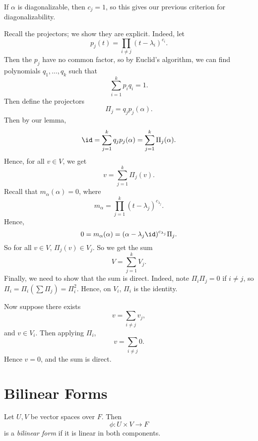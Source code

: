 \documentclass[12pt]{article}
\begin{document}
\begin{remark}
	If $\alpha$ is diagonalizable, then $c_j = 1$, so this gives our previous criterion for diagonalizability.
\end{remark}

\begin{proofbox}
	Recall the projectors; we show they are explicit. Indeed, let
	\[
		p_j(t) = \prod_{i \neq j}(t - \lambda_i)^{c_i}
	.\]
	Then the $p_j$ have no common factor, so by Euclid's algorithm, we can find polynomials $q_1, \ldots, q_k$ such that
	\[
	\sum_{i = 1}^{k} p_i q_i = 1
	.\]
	Then define the projectors
	\[
		\Pi_j = q_j p_j (\alpha)
	.\]
	Then by our lemma,
	\[
		\id = \sum_{j = 1}^{k} q_j p_j (\alpha) = \sum_{j = 1}^{k} \Pi_j(\alpha)
	.\]
	Hence, for all $v \in V$, we get
	\[
		v = \sum_{j = 1}^{k} \Pi_j(v)
	.\]
	Recall that $m_{\alpha}(\alpha) = 0$, where
	\[
		m_{\alpha} = \prod_{j = 1}^{k}(t - \lambda_j)^{c_{\lambda_j}}
	.\]
	Hence,
	\[
		0 = m_{\alpha}(\alpha) = (\alpha - \lambda_j \id)^{c_{\lambda_j}} \Pi_j
	.\]
	So for all $v \in V$, $\Pi_j(v) \in V_j$. So we get the sum
	\[
	V = \sum_{j = 1}^{k} V_j
	.\]
	Finally, we need to show that the sum is direct. Indeed, note $\Pi_i \Pi_j = 0$ if $i \neq j$, so $\Pi_i= \Pi_i ( \sum \Pi_j) = \Pi_i^2$. Hence, on $V_{i}$, $\Pi_i$ is the identity.

	Now suppose there exists
	\[
	v = \sum_{i \neq j} v_j
	,\]
	and $v \in V_i$. Then applying $\Pi_i$,
	\[
	v = \sum_{i \neq j} 0
	.\]
	Hence $v = 0$, and the sum is direct.
\end{proofbox}

\newpage

\section{Bilinear Forms}%
\label{sec:bilinear_forms}

\begin{definition}
	Let $U, V$ be vector spaces over $F$. Then
	\[
	\phi : U \times V \to F
	\]
	is a \textit{bilinear form} if it is linear in both components.
\end{definition}
\end{document}

